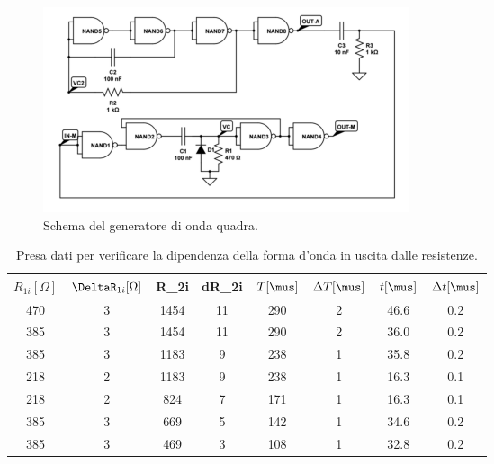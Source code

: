\documentclass[10pt,a4paper]{article}
\begin{document}




\begin{figure}[!htb]
  \centering
  \includegraphics[scale=0.5]{generatorequadra.png}
\caption{Schema del generatore di onda quadra.\label{fig:generatorequadra}}
\end{figure}



\begin{table}[!htb]
\centering
\begin{tabular}{|c|c|c|c|c|c|c|c|}
\hline 
$R_{1i} [\Omega]$ & $\DeltaR_{1i} [\Omega]$ & R_{2i} & dR_{2i} &$T [\mus]$ & $\Delta T [\mus]$&$t [\mus]$ & $\Delta t [\mus]$\\
\hline
 470 & 3 & 1454	& 11 & 290 & 2& 46.6& 0.2\\ 
\hline
385 & 3 & 1454	& 11 & 290 & 2& 36.0& 0.2\\ 
\hline 
 385 & 3 & 1183	& 9 & 238 & 1& 35.8& 0.2\\
\hline
218 & 2 & 1183	& 9 & 238 & 1& 16.3& 0.1\\ 
\hline
218 & 2 & 824	& 7 & 171 & 1& 16.3& 0.1\\ 
\hline
385 & 3 & 669	& 5 & 142 & 1& 34.6& 0.2\\ 
\hline
 385 & 3 & 469	& 3 & 108 & 1& 32.8& 0.2\\ 
 \hline
\end{tabular} 
\caption{Presa dati per verificare la dipendenza della forma d'onda in uscita dalle resistenze.\label{tab:generatore}}
\end{table}
\end{document}
